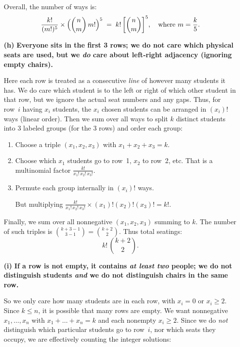 \documentclass[docmute]{article}
\begin{document}
\begin{enumerate}
    Overall, the number of ways is:
    \[
      \frac{k!}{(m!)^5} \times \Bigl(\binom{n}{m}\,m!\Bigr)^5
      \;=\;
      k!\,\biggl[\binom{n}{m}\biggr]^5,
      \quad\text{where }m=\frac{k}{5}.
    \]

  \item[\textbf{(h)}]
    \textbf{Everyone sits in the first 3 rows; we do not care which physical seats are used, but we \emph{do} care about left‐right adjacency (ignoring empty chairs).}

    Here each row is treated as a consecutive \emph{line} of however many students it has.  We do care which student is to the left or right of which other student in that row, but we ignore the actual seat numbers and any gaps.  Thus, for row~\(i\) having \(x_i\) students, the $x_i$ chosen students can be arranged in \((x_i)!\) ways (linear order).  Then we sum over all ways to split $k$ distinct students into 3 labeled groups (for the 3 rows) and order each group:

    \begin{enumerate}
      \item Choose a triple \((x_1,x_2,x_3)\) with $x_1+x_2+x_3 = k$.
      \item Choose which $x_1$ students go to row~1, $x_2$ to row~2, etc.  That is a multinomial factor $\frac{k!}{x_1!\,x_2!\,x_3!}$.
      \item Permute each group internally in $(x_i)!$ ways.

      But multiplying $\frac{k!}{x_1!\,x_2!\,x_3!}\times (x_1)!(x_2)!(x_3)! = k!.$
    \end{enumerate}

    Finally, we sum over all nonnegative $(x_1,x_2,x_3)$ summing to $k$.  The number of such triples is $\binom{k+3-1}{3-1} = \binom{k+2}{2}.$  Thus total seatings:
    \[
      k!\,\binom{k+2}{2}.
    \]

  \item[\textbf{(i)}]
    \textbf{If a row is not empty, it contains \emph{at least two} people; we do not distinguish students \emph{and} we do not distinguish chairs in the same row.}

    So we only care how many students are in each row, with $x_i=0$ or $x_i\ge2$.  Since $k\le n$, it is possible that many rows are empty.  We want nonnegative $x_1,\dots,x_n$ with $x_1+\dots+x_n = k$ and each nonempty $x_i\ge2$.  Since we do \emph{not} distinguish which particular students go to row~$i$, nor which seats they occupy, we are effectively counting the integer solutions:


\end{enumerate}
\end{document}
